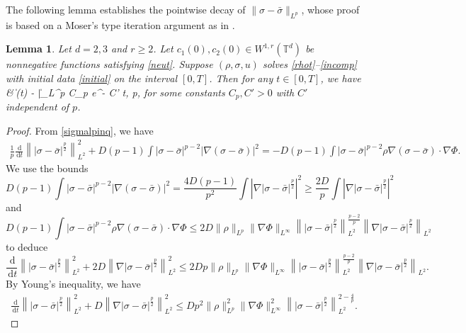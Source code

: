 \documentclass[10pt,twoside,reqno]{amsart}
\numberwithin{figure}{section}
\numberwithin{equation}{section}
\newtheorem{lemma}[theorem]{Lemma}
\theoremstyle{definition}
\def\bas#1#2\eas{\begin{align}\label{#1}\begin{split}#2\end{split}\end{align}}
\newcommand{\1}{\mathbbm{1}}
\newcommand{\diff}{\,\mathrm{d}}
\newcommand{\T}{\mathbb{T}}
\begin{document}
The following lemma establishes the pointwise decay of $\|\sigma - \bar{\sigma}\|_{L^p}$, whose proof is based on a Moser's type iteration argument as in \cite{BFS14, CL95, CIL20pa, IS21p}.
\begin{lemma}
Let $d = 2, 3$ and $r \geq 2$. Let $c_1(0), c_2(0) \in W^{1, r}(\T^d)$ be nonnegative functions satisfying \eqref{neut}. Suppose $(\rho, \sigma, u)$ solves \eqref{rhot}--\eqref{incomp} with initial data \eqref{initial} on the interval $[0, T]$. Then for any $t \in [0, T]$, we have
& \|\sigma(t) - \bar{\sigma}\|_{L^p} \leq C_p e^{- C' t}, \quad \quad \forall p,
\eas
for some constants $C_p, C' > 0$ with $C'$ independent of $p$.
\end{lemma}
\begin{proof}
From \eqref{sigmalpinq}, we have
\begin{align*}
\frac{1}{p} \frac{\diff}{\diff{t}} \left\||\sigma - \bar{\sigma}|^{\frac{p}{2}}\right\|_{L^2}^2 + D (p - 1) \int |\sigma - \bar{\sigma}|^{p - 2} |\nabla (\sigma - \bar{\sigma})|^2 = - D (p - 1) \int |\sigma - \bar{\sigma}|^{p - 2} \rho \nabla (\sigma - \bar{\sigma}) \cdot \nabla \Phi.
\end{align*}
We use the bounds
\[
D (p - 1) \int |\sigma - \bar{\sigma}|^{p - 2} |\nabla (\sigma - \bar{\sigma})|^2 = \frac{4 D (p - 1)}{p^2} \int \left|\nabla |\sigma - \bar{\sigma}|^{\frac{p}{2}}\right|^2 \geq \frac{2 D}{p} \int \left|\nabla |\sigma - \bar{\sigma}|^{\frac{p}{2}}\right|^2
\]
and
\[
D  (p - 1) \int |\sigma - \bar{\sigma}|^{p - 2} \rho \nabla (\sigma - \bar{\sigma}) \cdot \nabla \Phi \leq 2 D \|\rho\|_{L^p} \|\nabla \Phi\|_{L^\infty} \left\||\sigma - \bar{\sigma}|^{\frac{p}{2}}\right\|_{L^2}^{\frac{p - 2}{p}} \left\|\nabla |\sigma - \bar{\sigma}|^{\frac{p}{2}}\right\|_{L^2}
\]
to deduce
\[
\frac{\diff}{\diff{t}} \left\||\sigma - \bar{\sigma}|^{\frac{p}{2}}\right\|_{L^2}^2 + 2 D \left\|\nabla |\sigma - \bar{\sigma}|^{\frac{p}{2}}\right\|_{L^2}^2 \leq 2 D p \|\rho\|_{L^p} \|\nabla \Phi\|_{L^\infty} \left\||\sigma - \bar{\sigma}|^{\frac{p}{2}}\right\|_{L^2}^{\frac{p - 2}{p}} \left\|\nabla |\sigma - \bar{\sigma}|^{\frac{p}{2}}\right\|_{L^2}.
\]
By Young's inequality, we have
\begin{align}
\label{sigmaest0}
\frac{\diff}{\diff{t}} \left\||\sigma - \bar{\sigma}|^{\frac{p}{2}}\right\|_{L^2}^2 + D \left\|\nabla |\sigma - \bar{\sigma}|^{\frac{p}{2}}\right\|_{L^2}^2 \leq D p^2 \|\rho\|_{L^p}^2 \|\nabla \Phi\|_{L^\infty}^2 \left\||\sigma - \bar{\sigma}|^{\frac{p}{2}}\right\|_{L^2}^{2 - \frac{4}{p}}.
\end{align}

\end{proof}
\end{document}
